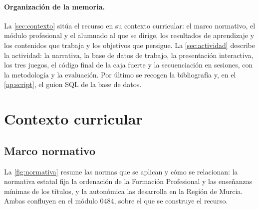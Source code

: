 \documentclass[11pt,a4paper]{article}
\begin{document}
\paragraph{Organización de la memoria.} La \autoref{sec:contexto} sitúa el recurso en su
contexto curricular: el marco normativo, el módulo profesional y el alumnado al que se
dirige, los resultados de aprendizaje y los contenidos que trabaja y los objetivos que
persigue. La \autoref{sec:actividad} describe la actividad: la narrativa, la base de datos de
trabajo, la presentación interactiva, los tres juegos, el código final de la caja fuerte y la
secuenciación en sesiones, con la metodología y la evaluación. Por último se recogen la
bibliografía y, en el \autoref{ap:script}, el guion SQL de la base de datos.

\section{Contexto curricular}
\label{sec:contexto}

\subsection{Marco normativo}

La \autoref{fig:normativa} resume las normas que se aplican y cómo se relacionan: la
normativa estatal fija la ordenación de la Formación Profesional y las enseñanzas mínimas de
los títulos, y la autonómica las desarrolla en la Región de Murcia. Ambas confluyen en el
módulo 0484, sobre el que se construye el recurso.
\end{document}
